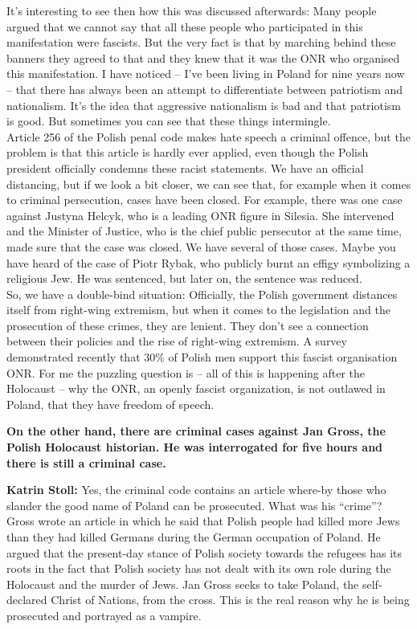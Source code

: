 It’s interesting to see then how this was discussed afterwards: Many people argued that we cannot say that all these people who participated in this manifestation were fascists. But the very fact is that by marching behind these banners they agreed to that and they knew that it was the ONR who organised this manifestation. I have noticed – I’ve been living in Poland for nine years now – that there has always been an attempt to differentiate between patriotism and nationalism. It’s the idea that aggressive nationalism is bad and that patriotism is good. But sometimes you can see that these things intermingle.\\ 
Article 256 of the Polish penal code makes hate speech a criminal offence, but the problem is that this article is hardly ever applied, even though the Polish president officially condemns these racist statements. We have an official distancing, but if we look a bit closer, we can see that, for example when it comes to criminal persecution, cases have been closed. For example, there was one case against Justyna Helcyk, who is a leading ONR figure in Silesia. She intervened and the Minister of Justice, who is the chief public persecutor at the same time, made sure that the case was closed. We have several of those cases. Maybe you have heard of the case of Piotr Rybak, who publicly burnt an effigy symbolizing a religious Jew. He was sentenced, but later on, the sentence was reduced.\\ 
So, we have a double-bind situation: Officially, the Polish government distances itself from right-wing extremism, but when it comes to the legislation and the prosecution of these crimes, they are lenient. They don’t see a connection between their policies and the rise of right-wing extremism. A survey demonstrated recently that 30\% of Polish men support this fascist organisation ONR. For me the puzzling question is – all of this is happening after the Holocaust – why the ONR, an openly fascist organization, is not outlawed in Poland, that they have freedom of speech.  

\textbf{On the other hand, there are criminal cases against Jan Gross, the Polish Holocaust historian. He was interrogated for five hours and there is still a criminal case.} 

\textbf{Katrin Stoll:} Yes, the criminal code contains an article where-by those who slander the good name of Poland can be prosecuted. What was his ``crime''? Gross wrote an article in which he said that Polish people had killed more Jews than they had killed Germans during the German occupation of Poland. He argued that the present-day stance of Polish society towards the refugees has its roots in the fact that Polish society has not dealt with its own role during the Holocaust and the murder of Jews. Jan Gross seeks to take Poland, the self-declared Christ of Nations, from the cross. This is the real reason why he is being prosecuted and portrayed as a vampire.  

